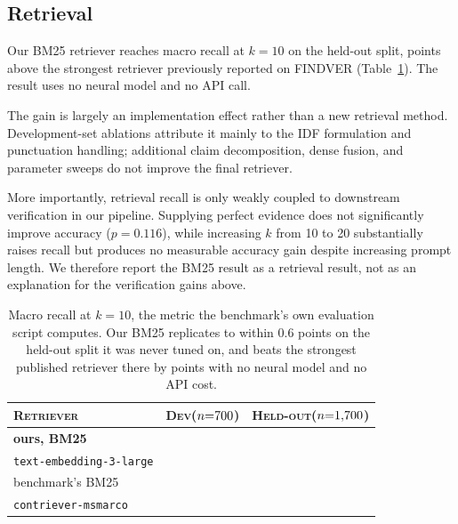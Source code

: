\documentclass{article}
\begin{document}
\subsection{Retrieval}
\label{sec:retrievalresults}

Our BM25 retriever reaches \recallOursTest{} macro recall at $k{=}10$ on the held-out split, \recallGainTest{} points above the strongest retriever previously reported on FINDVER (Table~\ref{tab:recall}). The result uses no neural model and no API call.

The gain is largely an implementation effect rather than a new retrieval method. Development-set ablations attribute it mainly to the IDF formulation and punctuation handling; additional claim decomposition, dense fusion, and parameter sweeps do not improve the final retriever.

More importantly, retrieval recall is only weakly coupled to downstream verification in our pipeline. Supplying perfect evidence does not significantly improve accuracy ($p = 0.116$), while increasing $k$ from 10 to 20 substantially raises recall but produces no measurable accuracy gain despite increasing prompt length. We therefore report the BM25 result as a retrieval result, not as an explanation for the verification gains above.

\begin{table}[t]
\caption{Macro recall at $k{=}10$, the metric the benchmark's own evaluation script computes.
Our BM25 replicates to within 0.6 points on the held-out split it was never tuned on, and
beats the strongest published retriever there by \recallGainTest{} points with no neural
model and no API cost.}
\label{tab:recall}
\centering
\begin{tabular}{lcc}
\toprule
\textsc{Retriever}
 & \textsc{Dev($n{=}700{}$)} & \textsc{Held-out($n{=}1{,}700{}$)}  \\
\midrule
\textbf{ours, BM25}                & \textbf{\recallOursDev{}} & \textbf{\recallOursTest{}} \\
\texttt{text-embedding-3-large}    & \recallEmbedDev{}         & \recallEmbedTest{} \\
benchmark's BM25                   & \recallUpstreamBMDev{}    & \recallUpstreamBMTest{} \\
\texttt{contriever-msmarco}        & \recallContrieverDev{}    & \recallContrieverTest{} \\
\bottomrule
\end{tabular}
\end{table}
\end{document}
